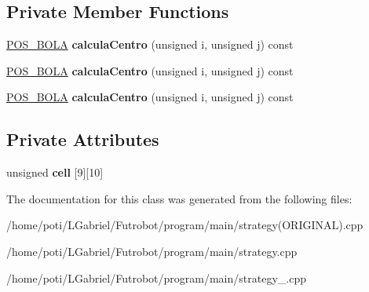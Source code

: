 \subsection*{Private Member Functions}
\begin{DoxyCompactItemize}
\item 
\hyperlink{structPOS__BOLA}{P\+O\+S\+\_\+\+B\+O\+LA} {\bfseries calcula\+Centro} (unsigned i, unsigned j) const \hypertarget{classRepulsao_a171254e2b51f3bcf8f13172fd4fe111a}{}\label{classRepulsao_a171254e2b51f3bcf8f13172fd4fe111a}

\item 
\hyperlink{structPOS__BOLA}{P\+O\+S\+\_\+\+B\+O\+LA} {\bfseries calcula\+Centro} (unsigned i, unsigned j) const \hypertarget{classRepulsao_a171254e2b51f3bcf8f13172fd4fe111a}{}\label{classRepulsao_a171254e2b51f3bcf8f13172fd4fe111a}

\item 
\hyperlink{structPOS__BOLA}{P\+O\+S\+\_\+\+B\+O\+LA} {\bfseries calcula\+Centro} (unsigned i, unsigned j) const \hypertarget{classRepulsao_a171254e2b51f3bcf8f13172fd4fe111a}{}\label{classRepulsao_a171254e2b51f3bcf8f13172fd4fe111a}

\end{DoxyCompactItemize}
\subsection*{Private Attributes}
\begin{DoxyCompactItemize}
\item 
unsigned {\bfseries cell} \mbox{[}9\mbox{]}\mbox{[}10\mbox{]}\hypertarget{classRepulsao_a7785c81f17f4657b140702a9d24f6736}{}\label{classRepulsao_a7785c81f17f4657b140702a9d24f6736}

\end{DoxyCompactItemize}


The documentation for this class was generated from the following files\+:\begin{DoxyCompactItemize}
\item 
/home/poti/\+L\+Gabriel/\+Futrobot/program/main/strategy(\+O\+R\+I\+G\+I\+N\+A\+L).\+cpp\item 
/home/poti/\+L\+Gabriel/\+Futrobot/program/main/strategy.\+cpp\item 
/home/poti/\+L\+Gabriel/\+Futrobot/program/main/strategy\+\_.\+cpp\end{DoxyCompactItemize}
